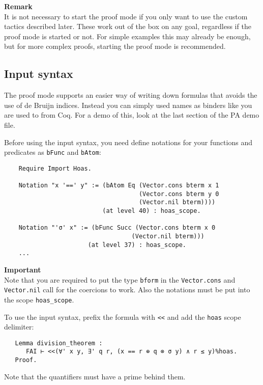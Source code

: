 \documentclass[12pt, a4paper]{article}
\newcommand{\important}[1]{
	\vspace{3pt}
	\begin{boximportant}
		\parbox{\textwidth}{\textcolor{colorimportant}{\textbf{Important}\\#1}}
	\end{boximportant}}
\newcommand{\remark}[1]{
	\vspace{3pt}
	\begin{boxremark}
		\parbox{\textwidth}{\textbf{Remark}\\#1}
	\end{boxremark}}
\begin{document}
\remark{It is not necessary to start the proof mode if you only want to use the custom tactics described later. These work out of the box on any goal, regardless if the proof mode is started or not. For simple examples this may already be enough, but for more complex proofs, starting the proof mode is recommended.}


\subsection{Input syntax}

The proof mode supports an easier way of writing down formulas that avoids the use of de Bruijn indices.
Instead you can simply used names as binders like you are used to from Coq.
For a demo of this, look at the last section of the PA demo file.

\medskip\noindent
Before using the input syntax, you need define notations for your functions and predicates as \texttt{bFunc} and \texttt{bAtom}:

\renewcommand\textsigma{\ensuremath{\mathtt{\sigma}}}
\begin{verbatim}
	Require Import Hoas.
	
	Notation "x '==' y" := (bAtom Eq (Vector.cons bterm x 1 
	                                 (Vector.cons bterm y 0
	                                 (Vector.nil bterm))))
	                       (at level 40) : hoas_scope.
	                       
	Notation "'σ' x" := (bFunc Succ (Vector.cons bterm x 0
	                               (Vector.nil bterm))) 
	                   (at level 37) : hoas_scope.
	...
\end{verbatim}

\important{Note that you are required to put the type \texttt{bform} in the \texttt{Vector.cons} and \texttt{Vector.nil} call for the coercions to work. Also the notations must be put into the scope \texttt{hoas\_scope}.}
To use the input syntax, prefix the formula with \texttt{<}\texttt{<} and add the \texttt{hoas} scope delimiter:
\begin{verbatim}
   Lemma division_theorem :
      FAI ⊢ <<(∀' x y, ∃' q r, (x == r ⊕ q ⊗ σ y) ∧ r ≤ y)%hoas.
   Proof.
\end{verbatim}
Note that the quantifiers must have a prime behind them.
\end{document}
